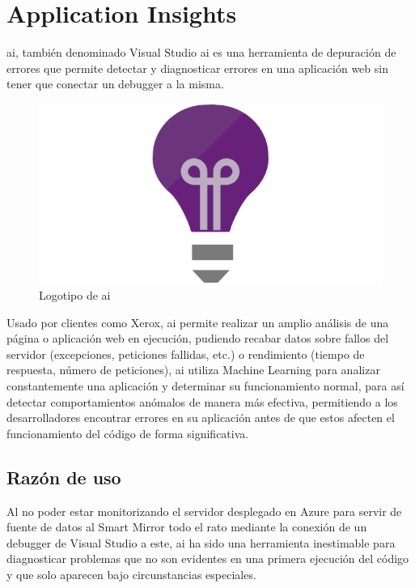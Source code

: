 \section{Application Insights}

\acrfull{ai}\cite{AI}, también denominado Visual Studio \acrfull{ai} es una herramienta de depuración de errores que permite detectar y diagnosticar errores en una aplicación web sin tener que conectar un debugger a la misma.

\begin{figure}[!htbp]
	\centering
	\includegraphics[scale=0.50]{fig/applicationinsights_logo}
	\caption{Logotipo de \acrfull{ai}}
\end{figure}

Usado por clientes como Xerox\cite{Xerox}, \acrshort{ai} permite realizar un amplio análisis de una página o aplicación web en ejecución, pudiendo recabar datos sobre fallos del servidor (excepciones, peticiones fallidas, etc.) o rendimiento (tiempo de respuesta, número de peticiones), \acrshort{ai} utiliza Machine Learning para analizar constantemente una aplicación y determinar su funcionamiento normal, para así detectar comportamientos anómalos de manera más efectiva, permitiendo a los desarrolladores encontrar errores en su aplicación antes de que estos afecten el funcionamiento del código de forma significativa.

\subsection{Razón de uso}

Al no poder estar monitorizando el servidor desplegado en Azure para servir de fuente de datos al Smart Mirror todo el rato mediante la conexión de un debugger de Visual Studio a este, \acrshort{ai} ha sido una herramienta inestimable para diagnosticar problemas que no son evidentes en una primera ejecución del código y que solo aparecen bajo circunstancias especiales.


